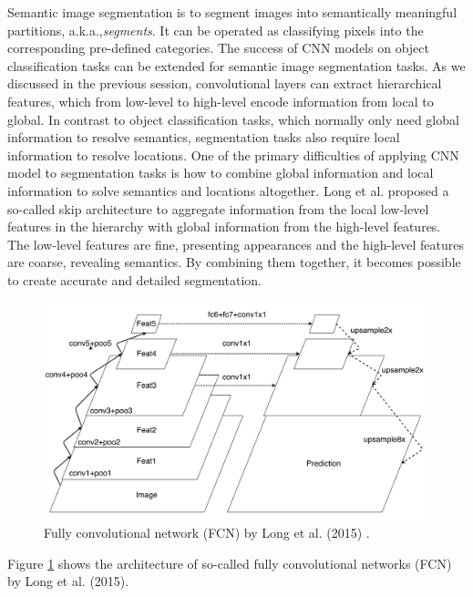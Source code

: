 Semantic image segmentation is to segment images into semantically meaningful partitions, a.k.a.,\textit{segments}.
It can be operated as classifying pixels into the corresponding pre-defined categories.
The success of CNN models on object classification tasks can be extended for semantic image segmentation tasks.\cite{long2015fully}
As we discussed in the previous session, convolutional layers can extract hierarchical features, which from low-level to high-level encode information from local to global.
In contrast to object classification tasks, which normally only need global information to resolve semantics, segmentation tasks also require local information to resolve locations.
One of the primary difficulties of applying CNN model to segmentation tasks is how to combine global information and local information to solve semantics and locations altogether.
Long et al.\cite{long2015fully} proposed a so-called skip architecture to aggregate information from the local low-level features in the hierarchy with global information from the high-level features.
The low-level features are fine, presenting appearances and the high-level features are coarse, revealing semantics.
By combining them together, it becomes possible to create accurate and detailed segmentation.

\begin{figure}[t]
\centering
   \includegraphics[width=\linewidth]{img/fcn}
\caption{Fully convolutional network (FCN) by Long et al. (2015) \cite{long2015fully}.}
\label{fig:fcn}
\end{figure}

Figure \ref{fig:fcn} shows the architecture of so-called fully convolutional networks (FCN) by Long et al. (2015).

